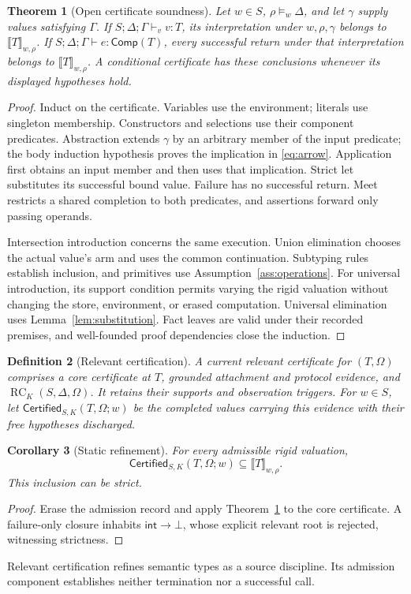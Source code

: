 \documentclass[10pt,a4paper]{article}
\newcommand{\sem}[1]{\llbracket #1\rrbracket}
\newcommand{\Comp}{\mathsf{Comp}}
\newcommand{\Int}{\mathsf{int}}
\newcommand{\RC}{\operatorname{RC}}
\newcommand{\jud}{S;\Delta;\Gamma}
\newcommand{\good}{\mathsf{Certified}}
\newtheorem{definition}{Definition}[section]
\newtheorem{theorem}[definition]{Theorem}
\newtheorem{corollary}[definition]{Corollary}
\theoremstyle{remark}
\begin{document}
\begin{theorem}[Open certificate soundness]\label{thm:soundness}
Let $w\in S$, $\rho\models_w\Delta$, and let $\gamma$ supply values satisfying
$\Gamma$. If $\jud\vdash_v v:T$, its interpretation under $w,\rho,\gamma$
belongs to $\sem T_{w,\rho}$. If $\jud\vdash e:\Comp(T)$, every successful
return under that interpretation belongs to $\sem T_{w,\rho}$. A conditional
certificate has these conclusions whenever its displayed hypotheses hold.
\end{theorem}
\begin{proof}
Induct on the certificate. Variables use the environment; literals use singleton
membership. Constructors and selections use their component predicates.
Abstraction extends $\gamma$ by an arbitrary member of the input predicate;
the body induction hypothesis proves the implication in \eqref{eq:arrow}.
Application first obtains an input member and then uses that implication.
Strict let substitutes its successful bound value. Failure has no successful
return. Meet restricts a shared completion to both predicates, and assertions
forward only passing operands.

Intersection introduction concerns the same execution. Union elimination
chooses the actual value's arm and uses the common continuation. Subtyping
rules establish inclusion, and primitives use Assumption~\ref{ass:operations}.
For universal introduction, its support condition permits varying the rigid
valuation without changing the store, environment, or erased computation.
Universal elimination uses Lemma~\ref{lem:substitution}. Fact leaves are valid
under their recorded premises, and well-founded proof dependencies close the
induction.
\end{proof}

\begin{definition}[Relevant certification]\label{def:certified}
A current relevant certificate for $(T,\Omega)$ comprises a core certificate at
$T$, grounded attachment and protocol evidence, and
$\RC_K(S,\Delta,\Omega)$. It retains their supports and observation triggers.
For $w\in S$, let $\good_{S,K}(T,\Omega;w)$ be the completed values carrying
this evidence with their free hypotheses discharged.
\end{definition}

\begin{corollary}[Static refinement]\label{cor:static-refinement}
For every admissible rigid valuation,
\[
 \good_{S,K}(T,\Omega;w)\subseteq\sem T_{w,\rho}.
\]
This inclusion can be strict.
\end{corollary}
\begin{proof}
Erase the admission record and apply Theorem~\ref{thm:soundness} to the core
certificate. A failure-only closure inhabits $\Int\to\bot$, whose explicit
relevant root is rejected, witnessing strictness.
\end{proof}
Relevant certification refines semantic types as a source discipline. Its
admission component establishes neither termination nor a successful call.
\end{document}
